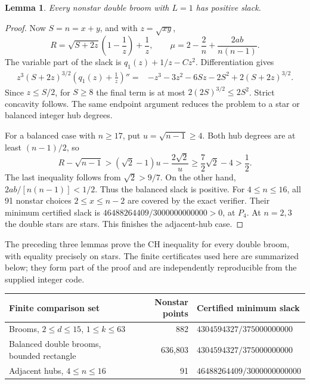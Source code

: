 \documentclass[11pt,a4paper]{article}
\newtheorem{lemma}[theorem]{Lemma}
\theoremstyle{remark}\newtheorem{remark}[theorem]{Remark}
\begin{document}
\begin{lemma}\label{lem:ch-adjacent-double-stars}
Every nonstar double broom with $L=1$ has positive slack.
\end{lemma}
\begin{proof}
Now $S=n=x+y$, and with $z=\sqrt{xy}$,
\[
 R=\sqrt{S+2z}\left(1-\frac1z\right)+\frac1z,
 \qquad \mu=2-\frac2n+\frac{2ab}{n(n-1)}.
\]
The variable part of the slack is $q_1(z)+1/z-Cz^2$.
Differentiation gives
\begin{align*}
 z^3(S+2z)^{3/2}\left(q_1(z)+\frac1z\right)''
 ={}&-z^3-3z^2-6Sz-2S^2+2(S+2z)^{3/2}.
\end{align*}
Since $z\le S/2$, for $S\ge8$ the final term is at most
$2(2S)^{3/2}\le2S^2$. Strict concavity follows. The same endpoint
argument reduces the problem to a star or balanced integer hub degrees.

For a balanced case with $n\ge17$, put $u=\sqrt{n-1}\ge4$.
Both hub degrees are at least $(n-1)/2$, so
\[
 R-\sqrt{n-1}>
 (\sqrt2-1)u-\frac{2\sqrt2}{u}
 \ge\frac72\sqrt2-4>\frac12.
\]
The last inequality follows from $\sqrt2>9/7$. On the other hand,
$2ab/[n(n-1)]<1/2$. Thus the balanced slack is positive.
For $4\le n\le16$, all 91 nonstar choices $2\le x\le n-2$
are covered by the exact verifier. Their minimum certified slack is
$46488264409/3000000000000>0$, at $P_4$. At $n=2,3$ the double stars
are stars. This finishes the adjacent-hub case.
\end{proof}

The preceding three lemmas prove the CH inequality for every double broom,
with equality precisely on stars. The finite certificates used here are
summarized below; they form part of the proof and are independently
reproducible from the supplied integer code.
\begin{center}\small
\begin{tabular}{@{}lrl@{}}\hline
Finite comparison set & Nonstar points & Certified minimum slack\\\hline
Brooms, $2\le d\le15$, $1\le k\le63$ &882&
 $4304594327/375000000000$\\
Balanced double brooms, bounded rectangle &636,803&
 $4304594327/375000000000$\\
Adjacent hubs, $4\le n\le16$ &91&
 $46488264409/3000000000000$\\\hline
\end{tabular}
\end{center}
\end{document}
